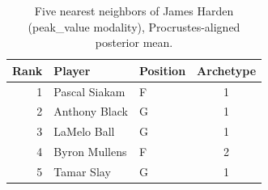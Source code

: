 \begin{table}[htbp]
  \centering\small
  \begin{tabular}{rllc}
    \toprule
    Rank & Player & Position & Archetype \\
    \midrule
    1 & Pascal Siakam & F & 1 \\
    2 & Anthony Black & G & 1 \\
    3 & LaMelo Ball & G & 1 \\
    4 & Byron Mullens & F & 2 \\
    5 & Tamar Slay & G & 1 \\
    \bottomrule
  \end{tabular}
  \caption{Five nearest neighbors of James Harden (peak_value modality), Procrustes-aligned posterior mean.}
  \label{tab:James_Harden_neighbors_peak_value}
\end{table}

